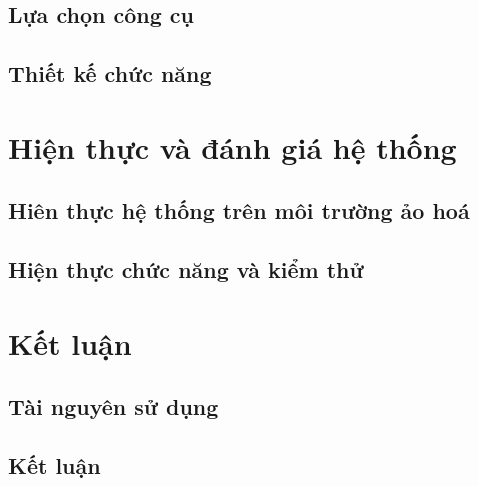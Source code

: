 \documentclass[12pt,titlepage,a4paper]{article}
\begin{document}
	\subsection{Lựa chọn công cụ}
	\subsection{Thiết kế chức năng}
	\section{Hiện thực và đánh giá hệ thống}
	\subsection{Hiên thực hệ thống trên môi trường ảo hoá}
	\subsection{Hiện thực chức năng và kiểm thử}
	\section{Kết luận}
	\subsection{Tài nguyên sử dụng}
	\subsection{Kết luận}
	
\end{document}

